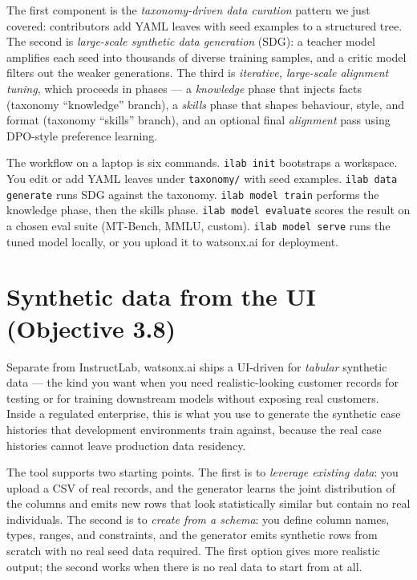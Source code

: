 The first component is the \emph{taxonomy-driven data curation} pattern we just covered: contributors add YAML leaves with seed examples to a structured tree. The second is \emph{large-scale synthetic data generation} (SDG): a teacher model amplifies each seed into thousands of diverse training samples, and a critic model filters out the weaker generations. The third is \emph{iterative, large-scale alignment tuning}, which proceeds in phases --- a \emph{knowledge} phase that injects facts (taxonomy ``knowledge'' branch), a \emph{skills} phase that shapes behaviour, style, and format (taxonomy ``skills'' branch), and an optional final \emph{alignment} pass using DPO-style preference learning.

The workflow on a laptop is six commands. \texttt{ilab init} bootstraps a workspace. You edit or add YAML leaves under \texttt{taxonomy/} with seed examples. \texttt{ilab data generate} runs SDG against the taxonomy. \texttt{ilab model train} performs the knowledge phase, then the skills phase. \texttt{ilab model evaluate} scores the result on a chosen eval suite (MT-Bench, MMLU, custom). \texttt{ilab model serve} runs the tuned model locally, or you upload it to watsonx.ai for deployment.


\section{Synthetic data from the UI (Objective 3.8)}

Separate from InstructLab, watsonx.ai ships a UI-driven  for \emph{tabular} synthetic data --- the kind you want when you need realistic-looking customer records for testing or for training downstream models without exposing real customers. Inside a regulated enterprise, this is what you use to generate the synthetic case histories that development environments train against, because the real case histories cannot leave production data residency.

The tool supports two starting points. The first is to \emph{leverage existing data}: you upload a CSV of real records, and the generator learns the joint distribution of the columns and emits new rows that look statistically similar but contain no real individuals. The second is to \emph{create from a schema}: you define column names, types, ranges, and constraints, and the generator emits synthetic rows from scratch with no real seed data required. The first option gives more realistic output; the second works when there is no real data to start from at all.

